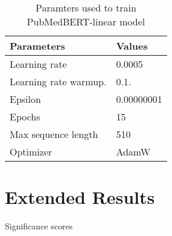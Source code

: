 \documentclass[10.7pt,]{article}
\begin{document}
\begin{table}[ht]
\centering
\begin{tabular}{|l|l|}
\hline
Parameters               & Values                            \\
\hline
Learning rate           & 0.0005                             \\
Learning rate warmup.   & 0.1.                               \\
Epsilon                 & 0.00000001                         \\
Epochs                  & 15                                 \\
Max sequence length     & 510                                \\
Optimizer               & AdamW                              \\
\hline
\end{tabular}
\caption{\label{ws:params} Paramters used to train PubMedBERT-linear model}
\end{table}
%
%
%
\section{Extended Results}\label{extend_res}
%
Significance scores
%
%
%
%
%
\end{document}
